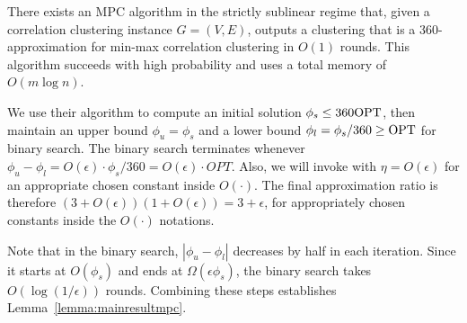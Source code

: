 \begin{theorem}
There exists an MPC algorithm in the strictly sublinear regime that, given a correlation clustering instance $G = (V, E)$, outputs a clustering that is a $360$-approximation for min-max correlation clustering in $O(1)$ rounds. This algorithm succeeds with high probability and uses a total memory of $O(m \log n)$.
\end{theorem}

We use their algorithm to compute an initial solution $\phi_{s} \leq 360 \mathrm{OPT}$, then maintain an upper bound $\phi_{u} = \phi_{s}$ and a lower bound $\phi_{l} = \phi_{s} / 360 \geq \mathrm{OPT}$ for binary search. The binary search terminates whenever $\phi_{u} - \phi_{l} = O(\epsilon) \cdot \phi_{s} / 360 = O(\epsilon)\cdot OPT $. Also, we will invoke  with $\eta = O(\epsilon)$ for an appropriate chosen constant inside $O(\cdot)$. The final approximation ratio is therefore $(3+O(\epsilon))(1+O(\epsilon)) = 3+\epsilon$, for appropriately chosen constants inside the $O(\cdot)$ notations.

Note that in the binary search, $|\phi_{u} - \phi_{l}|$ decreases by half in each iteration. Since it starts at $O(\phi_s)$ and ends at $\Omega(\epsilon \phi_s)$, the binary search takes $O(\log(1/\epsilon))$ rounds. Combining these steps establishes Lemma~\ref{lemma:mainresultmpc}.



